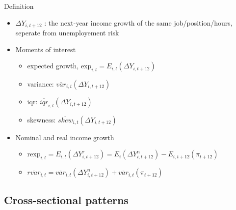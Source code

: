 \documentclass{beamer}
\begin{document}
\begin{frame}{Definition}
	\begin{itemize}
		\item $\Delta Y_{i,t+12}$ : the next-year income growth of the same job/position/hours, seperate from unemployement risk
		\item Moments of interest 
		\begin{itemize}
			\item expected growth, $\text{exp}_{i,t} = E_{i,t} (\Delta Y_{i,t+12})$
			\item variance: $\overline {var}_{i,t}(\Delta Y_{i,t+12})$ 
			\item iqr: $\overline {iqr}_{i,t}(\Delta Y_{i,t+12})$ 
			\item skewness: $\overline {skew}_{i,t}(\Delta Y_{i,t+12})$
		\end{itemize}
		\item Nominal and real income growth 
		\begin{itemize}
			\item $\text{rexp}_{i,t} =E_{i,t}(\Delta Y^r_{i,t+12}) =E_i(\Delta Y_{i,t+12}^n) - E_{i,t+12}(\pi_{t+12})$
			\item $\overline{rvar}_{i,t}=\overline {var}_{i,t}(\Delta Y_{i,t+12}^n) +  \overline {var}_{i,t}(\pi_{t+12})$
		\end{itemize}
	\end{itemize}
\end{frame}

\subsection{Cross-sectional patterns}

\end{document}
